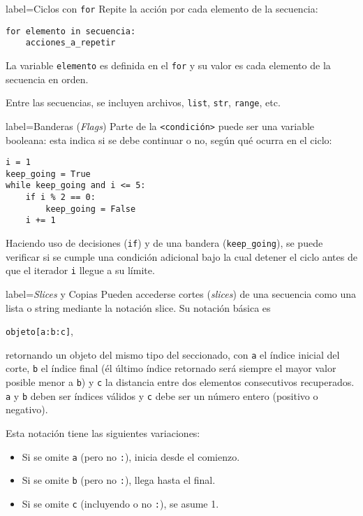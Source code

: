 \begin{contentbox}{label=Ciclos con \texttt{for}}
    Repite la acción por cada elemento de la secuencia:
\begin{lstlisting}
for elemento in secuencia:
    acciones_a_repetir
\end{lstlisting}
    
    La variable \lstinline!elemento! es definida en el \lstinline!for! y su valor es cada elemento de la secuencia en orden.
    
    Entre las secuencias, se incluyen archivos, \lstinline!list!, \lstinline!str!, \lstinline!range!, etc.
\end{contentbox}

\begin{contentbox}{label=Banderas (\textit{Flags})}
    Parte de la \lstinline!<condición>! puede ser una variable booleana: esta indica si se debe continuar o no, según qué ocurra en el ciclo:
    
\begin{lstlisting}
i = 1
keep_going = True
while keep_going and i <= 5:
    if i % 2 == 0:
        keep_going = False
    i += 1
\end{lstlisting}

    Haciendo uso de decisiones (\lstinline!if!) y de una bandera (\lstinline!keep_going!), se puede verificar si se cumple una condición adicional bajo la cual detener el ciclo antes de que el iterador \lstinline!i! llegue a su límite.
\end{contentbox}

\begin{contentbox}{label=\textit{Slices} y Copias}
    Pueden accederse \alert{cortes} (\textit{slices}) de una secuencia como una lista o string mediante la \alert{notación slice}. Su notación básica es
    \begin{center}
        \lstinline!objeto[a:b:c]!,
    \end{center}
    retornando un objeto del mismo tipo del seccionado, con \lstinline!a! el índice inicial del corte, \lstinline!b! el índice final (él último índice retornado será siempre el mayor valor posible menor a \lstinline!b!) y \lstinline!c! la distancia entre dos elementos consecutivos recuperados. \lstinline!a! y \lstinline!b! deben ser índices válidos y \lstinline!c! debe ser un número entero (positivo o negativo).
    
    Esta notación tiene las siguientes variaciones:
    \begin{itemize}
        \item Si se omite \lstinline!a! (pero no \lstinline!:!), inicia desde el comienzo.
        \item Si se omite \lstinline!b! (pero no \lstinline!:!), llega hasta el final.
        \item Si se omite \lstinline!c! (incluyendo o no \lstinline!:!), se asume 1.
    \end{itemize}
\end{contentbox}



